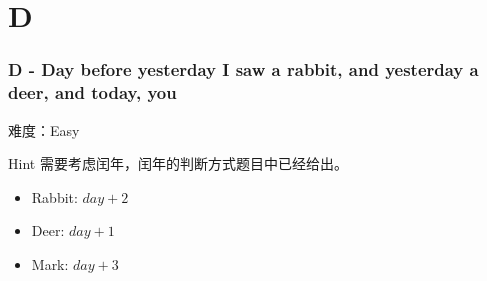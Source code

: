 \section{D}
\begin{frame}
\frametitle{D - Day before yesterday I saw a rabbit, and yesterday a deer, and today, you}
难度：Easy

\begin{block}{Hint}
    需要考虑闰年，闰年的判断方式题目中已经给出。
\end{block}

\begin{itemize}
    \item Rabbit: $day + 2$
    \item Deer: $day + 1$
    \item Mark: $day + 3$
\end{itemize}
\end{frame}